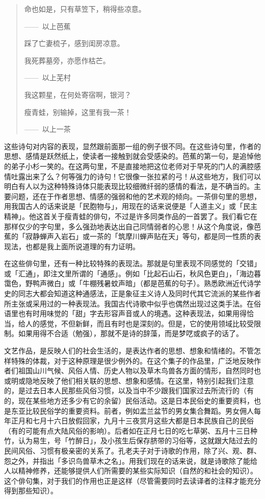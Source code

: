 {\begin{quote}
      命也如是，只有草笠下，稍得些凉意。

      \hfill ——~以上芭蕉

      踩了亡妻梳子，感到闺房凉意。

      我死葬墓旁，亦愿作枯芒。

      \hfill ——~以上芜村

      我这颗星，在何处寄宿啊，银河？

      瘦青蛙，别输掉，这里有我一茶！

      \hfill ——~以上一茶
  \end{quote}

  这些诗句对内容的表现，显然跟前面那一组的例子很不同。在这些诗句里，作者的思想、感情是跃然纸上，使读者一接触到就会受感染的。芭蕉的第一句，是追悼他的弟子小杉一笑的。在这两句里，不是直接地把这位老师对于早死的门人的满腔感情吐露出来了么？何等强力的诗句！它很像一张拉紧的弓！从这些地方，我们可以明白有人以为这种特殊诗体只能表现比较细微纤弱的感情的看法，是不确当的。主要问题，还在于作者思想、情感的强弱和他的艺术观的倾向。一茶俳句里的思想，用我国古人的话来说是「民胞物与」，用现在的话来说便是「人道主义」或「民主精神」。他这首关于瘦青蛙的俳句，不过是许多同类作品的一首罢了。我们看它在那样仅少的字句里，多么强劲地表达出自己同情弱者的心思！从这个角度说，像芭蕉的「寂静蝉声入岩石」或一茶的「筑摩川蝉声贴在天」等句，都是同一性质的表现法，也都是我上面所说道理的有力证明。

  在这些俳句里，还有一种比较特殊的表现法。那就是句里表现不同感觉的「交错」或「汇通」，即注文里所谓的「通感」。例如「比起石山石，秋风色更白」，「海边暮霭色，野鸭声微白」或「牛棚残暑蚊声暗」（都是芭蕉的句子）。熟悉欧洲近代诗学史的同志大都会知道这种通感法，正是象征主义诗人及同时代其它流派的某些作者所主张或采用过的一种表现法。我国古代诗歌中似乎也偶然出现过这类手法。在俗语里也有时用味觉的「甜」字去形容声音或人的境遇。这种表现法，如果用得恰当，给人的感觉，不但新鲜，而且有时也是深刻的。但是，它的使用领域比较受限制。如果用得不合适（勉强），那就不是诗的辞藻，而是梦呓或疯子的话了。

  文艺作品，是反映人们的社会生活的，是表达作者的思想、想象和情绪的。不管怎样特殊的体裁，对于这种原理是很少例外的。在这个集子的作品里，广泛地反映作者们祖国山川气候、风俗人情、历史人物以及草木鸟兽各方面的情形，自然同时也或明或隐地反映了他们相关联的思想、想象和感情。在这里，特别引起我们注意的，是过去日本人民那些风俗习惯，以及当中不少跟我们国家过去所流行的（有的，现在某些地方还多少有它的余留）民俗活动。这是日本民俗史的重要资料，也是东亚比较民俗学的重要资料。前者，例如盂兰盆节的男女集合舞蹈。男女佣人每年正月和七月十六日放假回家，九月十三夜赏月这些大都是日本民族自己的民俗（有的可能有点大陆风俗的影响）。后者如在正月七日的吃七草粥、五月十三日种竹，认为易生，号「竹醉日」，及小孩生后保存脐带的习俗等，这就跟大陆过去的民间风俗、习惯有极亲密的关系了。孔老夫子对于诗歌的作用，除了兴、观、群、怨之外，并指出「多识鸟兽草木之名」。用我们现在的话来说，就是诗歌除了能给人以精神修养，还能够提供人们所需要的某些实际知识（自然的和社会的知识）。这个俳句集，对于我们的作用也正是这样（尽管需要同时去读译者的注释才能充分得到那些知识）。

}
